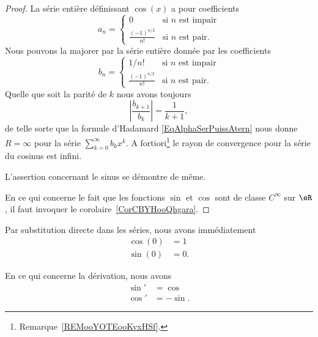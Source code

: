 \begin{proof}
    La série entière définissant \( \cos(x)\) a pour coefficients
    \begin{equation}
        a_n=\begin{cases}
            0    &   \text{si } n\text{ est impair}\\
            \frac{ (-1)^{n/2} }{ n! }    &   \text{si } n\text{ est pair}.
        \end{cases}
    \end{equation}
    Nous pouvons la majorer par la série entière donnée par les coefficients
    \begin{equation}
        b_n=\begin{cases}
            1/n!    &   \text{si } n\text{ est impair}\\
            \frac{ (-1)^{n/2} }{ n! }    &   \text{si } n\text{ est pair}.
        \end{cases}
    \end{equation}
    Quelle que soit la parité de \( k\) nous avons toujours
    \begin{equation}
        | \frac{ b_{k+1} }{ b_k } |=\frac{1}{ k+1 },
    \end{equation}
    de telle sorte que la formule d'Hadamard \eqref{EqAlphaSerPuissAtern} nous donne \( R=\infty\) pour la série \( \sum_{k=0}^{\infty}b_kx^k\). A fortiori\footnote{Remarque~\ref{REMooYOTEooKvxHSf}.} le rayon de convergence pour la série du cosinus est infini.

    L'assertion concernant le sinus se démontre de même.

    En ce qui concerne le fait que les fonctions \( \sin\) et \( \cos\) sont de classe \(  C^{\infty}\) sur \( \eR\), il faut invoquer le corolaire~\ref{CorCBYHooQhgara}.
\end{proof}

Par substitution directe dans les séries, nous avons immédiatement
\begin{subequations}        \label{SUBEQooTTNNooXzApSM}
    \begin{align}
        \cos(0)&=1\\
        \sin(0)&=0.
    \end{align}
\end{subequations}

\begin{lemma}       \label{LEMooBBCAooHLWmno}
    En ce qui concerne la dérivation, nous avons
    \begin{subequations}
        \begin{align}
            \sin'&=\cos\\
            \cos'&=-\sin.
        \end{align}
    \end{subequations}
\end{lemma}

